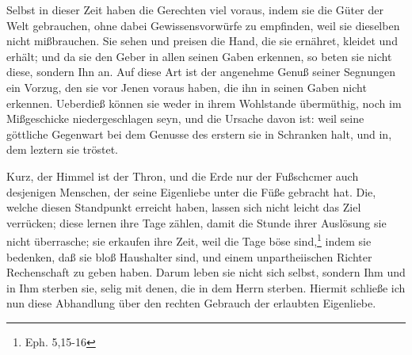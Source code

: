 \medskip

Selbst in dieser Zeit haben die Gerechten viel voraus, indem sie die Güter der
Welt gebrauchen, ohne dabei Gewissensvorwürfe zu empfinden, weil sie dieselben
nicht mißbrauchen. Sie sehen und preisen die Hand, die sie ernähret, kleidet und
erhält; und da sie den Geber in allen seinen Gaben erkennen, so beten sie nicht
diese, sondern Ihn an. Auf diese Art ist der angenehme Genuß seiner Segnungen
ein Vorzug, den sie vor Jenen voraus haben, die ihn in seinen Gaben nicht
erkennen. Ueberdieß können sie weder in ihrem Wohlstande übermüthig, noch im
Mißgeschicke niedergeschlagen seyn, und die Ursache davon ist: weil seine
göttliche Gegenwart bei dem Genusse des erstern sie in Schranken halt, und in,
dem leztern sie tröstet.

\medskip

Kurz, der Himmel ist der Thron, und die Erde nur der Fußschcmer auch desjenigen
Menschen, der seine Eigenliebe unter die Füße gebracht hat. Die, welche diesen
Standpunkt erreicht haben, lassen sich nicht leicht das Ziel verrücken; diese
lernen ihre Tage zählen, damit die Stunde ihrer Auslösung sie nicht überrasche;
sie erkaufen ihre Zeit, weil die Tage böse sind,\footnote{Eph. 5,15-16} indem
sie bedenken, daß sie bloß Haushalter sind, und einem unpartheiischen Richter
Rechenschaft zu geben haben. Darum leben sie nicht sich selbst, sondern Ihm und
in Ihm sterben sie, selig mit denen, die in dem Herrn sterben. Hiermit schließe
ich nun diese Abhandlung über den rechten Gebrauch der erlaubten Eigenliebe.






